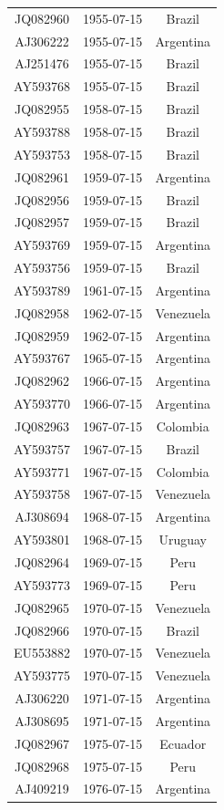 \documentclass[a4paper,10pt]{article}
\begin{document}
\begin{center}
\begin{longtable}{ccc}
\hline \hline
\endlastfoot
JQ082960 & 1955-07-15 & Brazil \\
AJ306222 & 1955-07-15 & Argentina \\
AJ251476 & 1955-07-15 & Brazil \\
AY593768 & 1955-07-15 & Brazil \\
JQ082955 & 1958-07-15 & Brazil \\
AY593788 & 1958-07-15 & Brazil \\
AY593753 & 1958-07-15 & Brazil \\
JQ082961 & 1959-07-15 & Argentina \\
JQ082956 & 1959-07-15 & Brazil \\
JQ082957 & 1959-07-15 & Brazil \\
AY593769 & 1959-07-15 & Argentina \\
AY593756 & 1959-07-15 & Brazil \\
AY593789 & 1961-07-15 & Argentina \\
JQ082958 & 1962-07-15 & Venezuela \\
JQ082959 & 1962-07-15 & Argentina \\
AY593767 & 1965-07-15 & Argentina \\
JQ082962 & 1966-07-15 & Argentina \\
AY593770 & 1966-07-15 & Argentina \\
JQ082963 & 1967-07-15 & Colombia \\
AY593757 & 1967-07-15 & Brazil \\
AY593771 & 1967-07-15 & Colombia \\
AY593758 & 1967-07-15 & Venezuela \\
AJ308694 & 1968-07-15 & Argentina \\
AY593801 & 1968-07-15 & Uruguay \\
JQ082964 & 1969-07-15 & Peru \\
AY593773 & 1969-07-15 & Peru \\
JQ082965 & 1970-07-15 & Venezuela \\
JQ082966 & 1970-07-15 & Brazil \\
EU553882 & 1970-07-15 & Venezuela \\
AY593775 & 1970-07-15 & Venezuela \\
AJ306220 & 1971-07-15 & Argentina \\
AJ308695 & 1971-07-15 & Argentina \\
JQ082967 & 1975-07-15 & Ecuador \\
JQ082968 & 1975-07-15 & Peru \\
AJ409219 & 1976-07-15 & Argentina \\

\end{longtable}
\end{center}
\end{document}

